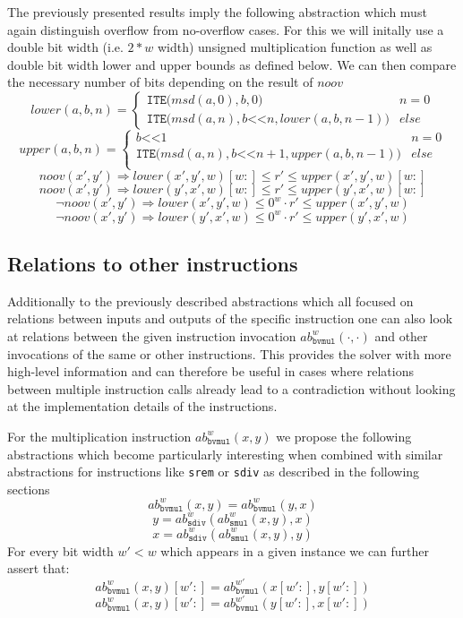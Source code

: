 The previously presented results imply the following abstraction which must again distinguish overflow from no-overflow cases. For this we will initally use a double bit width (i.e. $2*w$ width) unsigned multiplication function as well as double bit width lower and upper bounds as defined below. We can then compare the necessary number of bits depending on the result of $noov$
$$
    lower(a, b, n)=
    \begin{cases}
        \texttt{ITE(} msd(a,0), b, 0 \texttt{)} & n=0\\
        \texttt{ITE(} msd(a,n), b \texttt{<<} n, lower(a, b, n-1) \texttt{)} & else
    \end{cases}
$$$$
    upper(a, b, n)=
    \begin{cases}
        b\texttt{<<}1 & n=0\\
        \texttt{ITE(} msd(a,n), b \texttt{<<} n+1, upper(a, b, n-1) \texttt{)} & else\\
    \end{cases}
$$$$
    noov(x',y') \Rightarrow lower(x',y',w)[w:] \leq r' \leq upper(x',y',w)[w:]
$$$$
     noov(x',y') \Rightarrow lower(y',x',w)[w:] \leq r' \leq upper(y',x',w)[w:]
$$$$
    \neg noov(x',y') \Rightarrow lower(x',y',w) \leq 0^w\cdot r' \leq upper(x',y',w)
$$$$
     \neg noov(x',y') \Rightarrow lower(y',x',w) \leq 0^w\cdot r' \leq upper(y',x',w)
$$

\subsection{Relations to other instructions}
Additionally to the previously described abstractions which all focused on relations between inputs and outputs of the specific instruction one can also look at relations between the given instruction invocation $ab_\texttt{bvmul}^w(\cdot,\cdot)$ and other invocations of the same or other instructions. This provides the solver with more high-level information and can therefore be useful in cases where relations between multiple instruction calls already lead to a contradiction without looking at the implementation details of the instructions.

For the multiplication instruction $ab_\texttt{bvmul}^w(x,y)$ we propose the following abstractions which become particularly interesting when combined with similar abstractions for instructions like \texttt{srem} or \texttt{sdiv} as described in the following sections
\[
    ab_\texttt{bvmul}^w(x,y) = ab_\texttt{bvmul}^w(y,x)
\]
\[
    y = ab_\texttt{sdiv}^w(ab_\texttt{smul}^w(x,y),x)
\]
\[
    x = ab_\texttt{sdiv}^w(ab_\texttt{smul}^w(x,y),y)
\]
For every bit width $w'<w$ which appears in a given instance we can further assert that:
\[
    ab_\texttt{bvmul}^w(x,y)[w':] = ab_\texttt{bvmul}^{w'}(x[w':],y[w':])
\]
\[
    ab_\texttt{bvmul}^w(x,y)[w':] = ab_\texttt{bvmul}^{w'}(y[w':],x[w':])
\]

